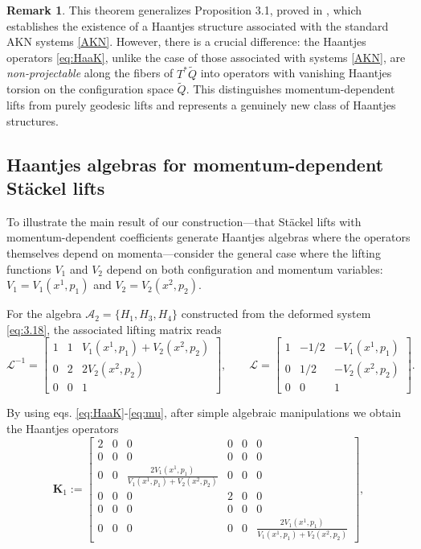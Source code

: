 \documentclass[10pt]{amsart}
\numberwithin{equation}{section}
\newcommand{\bs}{\boldsymbol}
\theoremstyle{definition}
\newtheorem{remark}{\textbf{Remark}}
\begin{document}
	\begin{remark}
		This theorem generalizes Proposition 3.1, proved in \cite{TT2016SIGMA}, which establishes the existence of a Haantjes structure associated with the standard AKN systems \eqref{AKN}. However, there is a crucial difference: the Haantjes operators \eqref{eq:HaaK}, unlike the case of those associated with systems \eqref{AKN}, are \textit{non-projectable} along the fibers of $T^{*}\tilde{Q}$ into operators with vanishing Haantjes torsion on the configuration space $\tilde{Q}$. This distinguishes momentum-dependent lifts from purely geodesic lifts and represents a genuinely new class of Haantjes structures.
	\end{remark}
	
	\subsection{Haantjes algebras for momentum-dependent Stäckel lifts} 
	
	To illustrate the main result of our construction—that Stäckel lifts with momentum-dependent coefficients generate Haantjes algebras where the operators themselves depend on momenta—consider the general case where the lifting functions $V_1$ and $V_2$ depend on both configuration and momentum variables: $V_1 = V_1(x^1, p_1)$ and $V_2 = V_2(x^2, p_2)$.
	
	For the algebra $\mathcal{A}_2=\{H_1,H_3, H_4 \}$ constructed from the deformed system \eqref{eq:3.18}, the associated lifting matrix reads
	\begin{equation} \label{Stackel 2}
		\mathcal{L}^{-1}= 
		\begin{bmatrix}
			1 & 1 & V_1(x^1, p_1)+V_2(x^2, p_2) \\ 
			0 & 2 & 2 V_2(x^2, p_2) \\ 
			0 & 0 & 1
		\end{bmatrix}, \qquad \mathcal{L}= 
		\begin{bmatrix}
			1 & -1/2 & -V_1(x^1, p_1) \\ 
			0 & 1/2 & -V_2(x^2, p_2) \\ 
			0 & 0 & 1
		\end{bmatrix}.
	\end{equation}
	
	By using eqs. \eqref{eq:HaaK}-\eqref{eq:mu}, after simple algebraic manipulations we obtain the Haantjes operators
	\begin{equation}\label{K1 cart mom}
		\bs{K}_1:=\left[\begin{array}{cccccc}
			2 & 0 & 0 & 0 & 0 & 0 \\
			0 & 0 & 0 & 0 & 0 & 0 \\
			0 & 0 & \frac{2 V_1(x^1, p_1)}{V_1(x^1, p_1)+V_2(x^2, p_2)} & 0 & 0&0 \\
			0 & 0 & 0 & 2 & 0 & 0 \\
			0 & 0 & 0 & 0 & 0 & 0 \\
			0 & 0 & 0 & 0 & 0 & \frac{2 V_1(x^1, p_1)}{V_1(x^1, p_1)+V_2(x^2, p_2)}
		\end{array}\right],
	\end{equation}
	
\end{document}
